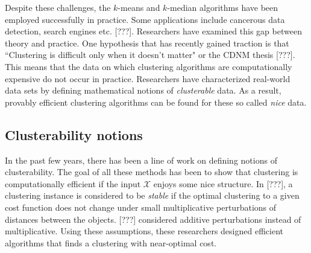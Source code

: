 \documentclass[11pt]{article}
\newcommand{\mc}{\mathcal}
\begin{document}
Despite these challenges, the $k$-means and $k$-median algorithms have been employed successfully in practice. Some applications include cancerous data detection, search engines etc. {\color{red} [???]}. Researchers have examined this gap between theory and practice. One hypothesis that has recently gained traction is that ``Clustering is difficult only when it doesn't matter" or the CDNM thesis {\color{red} [???]}. This means that the data on which clustering algorithms are computationally expensive do not occur in practice. Researchers have characterized real-world data sets by defining mathematical notions of \textit{clusterable} data. As a result, provably efficient clustering algorithms can be found for these so called {\em nice} data.  

\subsection{Clusterability notions}
In the past few years, there has been a line of work on defining notions of clusterability. The goal of all these methods has been to show that clustering is computationally efficient if the input $\mc X$ enjoys some nice structure. In {\color{red} [???]\cite{bilu2012stable}}, a clustering instance is considered to be \emph{stable} if the optimal clustering to a given cost function does not change under small multiplicative perturbations of distances between the objects. {\color{red} [???]\cite{ackerman2009clusterability}} considered additive perturbations instead of multiplicative.  Using these assumptions, these researchers designed efficient algorithms that finds a clustering with near-optimal cost. 
\end{document}
